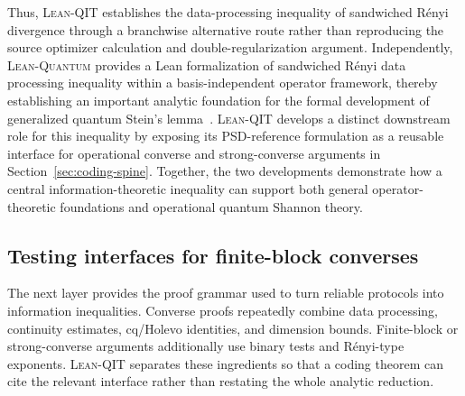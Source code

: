 \documentclass[10pt,a4paper]{article}
\DeclareRobustCommand{\LeanQIT}{\textnormal{\textsc{Lean-QIT}}}
\DeclareRobustCommand{\LeanQuantum}{\textnormal{\textsc{Lean-Quantum}}}
\begin{document}
Thus, \LeanQIT{} establishes the data-processing inequality of sandwiched R\'enyi divergence through a branchwise alternative route rather than reproducing the source optimizer calculation and double-regularization argument.  Independently,
\LeanQuantum{} provides a Lean formalization of sandwiched R\'enyi data processing inequality within a basis-independent operator framework, thereby establishing an important analytic foundation for the formal development of generalized quantum Stein's lemma~\cite{Kasaura2026LeanQuantum}.
\LeanQIT{} develops a distinct downstream role for this inequality by exposing
its PSD-reference formulation as a reusable interface for operational converse
and strong-converse arguments in Section~\ref{sec:coding-spine}. Together,
the two developments demonstrate how a central information-theoretic
inequality can support both general operator-theoretic foundations and
operational quantum Shannon theory.
	
	
\subsection{Testing interfaces for finite-block converses}
\label{subsec:converse-testing}

The next layer provides the proof grammar used to turn reliable protocols into
information inequalities.  Converse proofs repeatedly combine data processing,
continuity estimates, cq/Holevo identities, and dimension bounds. Finite-block
or strong-converse arguments additionally use binary tests and R\'enyi-type
exponents.  \LeanQIT{} separates these ingredients so that a coding theorem can	cite the relevant interface rather than restating the whole analytic
reduction.
\end{document}
